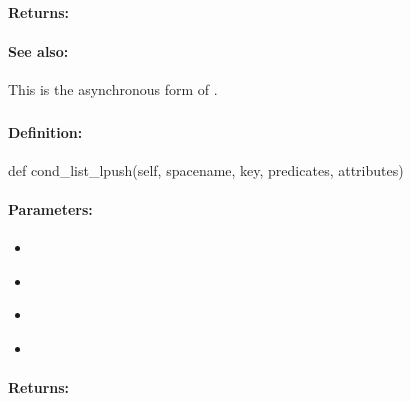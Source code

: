 \paragraph{Returns:}


\paragraph{See also:}  This is the asynchronous form of .

\pagebreak
\subsubsection{}
\label{api:python:cond_list_lpush}


\paragraph{Definition:}
\begin{pythoncode}
def cond_list_lpush(self, spacename, key, predicates, attributes)
\end{pythoncode}

\paragraph{Parameters:}
\begin{itemize}[noitemsep]
\item {}\\

\item {}\\

\item {}\\

\item {}\\

\end{itemize}

\paragraph{Returns:}


